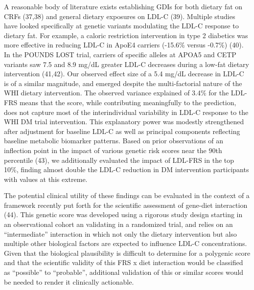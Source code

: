 \documentclass[]{article}
\begin{document}
A reasonable body of literature exists establishing GDIs for both
dietary fat on CRFs (37,38) and general dietary exposures on LDL-C (39).
Multiple studies have looked specifically at genetic variants modulating
the LDL-C response to dietary fat. For example, a caloric restriction
intervention in type 2 diabetics was more effective in reducing LDL-C in
ApoE4 carriers (-15.6\% versus -0.7\%) (40). In the POUNDS LOST trial,
carriers of specific alleles at APOA5 and CETP variants saw 7.5 and 8.9
mg/dL greater LDL-C decreases during a low-fat dietary intervention
(41,42). Our observed effect size of a 5.4 mg/dL decrease in LDL-C is of
a similar magnitude, and emerged despite the multi-factorial nature of
the WHI dietary intervention. The observed variance explained of 3.4\%
for the LDL-FRS means that the score, while contributing meaningfully to
the prediction, does not capture most of the interindividual variability
in LDL-C response to the WHI DM trial intervention. This explanatory
power was modestly strengthened after adjustment for baseline LDL-C as
well as principal components reflecting baseline metabolic biomarker
patterns. Based on prior observations of an inflection point in the
impact of various genetic risk scores near the 90th percentile (43), we
additionally evaluated the impact of LDL-FRS in the top 10\%, finding
almost double the LDL-C reduction in DM intervention participants with
values at this extreme.

The potential clinical utility of these findings can be evaluated in the
context of a framework recently put forth for the scientific assessment
of gene-diet interaction (44). This genetic score was developed using a
rigorous study design starting in an observational cohort an validating
in a randomized trial, and relies on an ``intermediate'' interaction in
which not only the dietary intervention but also multiple other
biological factors are expected to influence LDL-C concentrations. Given
that the biological plausibility is difficult to determine for a
polygenic score and that the scientific validity of this FRS x diet
interaction would be classified as ``possible'' to ``probable'',
additional validation of this or similar scores would be needed to
render it clinically actionable.
\end{document}
